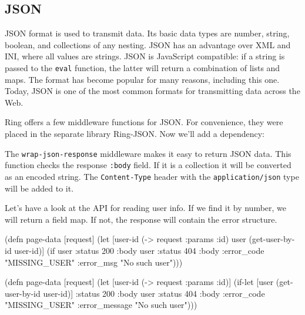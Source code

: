 \subsection{JSON}


JSON format is used to transmit data. Its basic data types are number, string, boolean, and collections of any nesting. JSON has an advantage over XML and INI, where all values are strings. JSON is JavaScript compatible: if a string is passed to the \verb|eval| function, the latter will return a combination of lists and maps. The format has become popular for many reasons, including this one. Today, JSON is one of the most common formats for transmitting data across the Web.

Ring offers a few middleware functions for JSON. For convenience, they were placed in the separate library Ring-JSON. Now we'll add a dependency:

\begin{clojure}
\end{clojure}


The \verb|wrap-json-response| middleware makes it easy to return JSON data. This function checks the response \verb|:body| field. If it is a collection it will be converted as an encoded string. The \verb|Content-Type| header with the \verb|application/json| type will be added to it.

Let's have a look at the API for reading user info. If we find it by number, we will return a field map. If not, the response will contain the error structure.

\ifx\DEVICETYPE\MOBILE

\begin{clojure}
(defn page-data [request]
  (let [user-id (-> request :params :id)
        user (get-user-by-id user-id)]
    (if user
      {:status 200 :body user}
      {:status 404
       :body
       {:error_code "MISSING_USER"
        :error_msg "No such user"}})))
\end{clojure}

\else

\begin{clojure}
(defn page-data [request]
  (let [user-id (-> request :params :id)]
    (if-let [user (get-user-by-id user-id)]
      {:status 200 :body user}
      {:status 404
       :body {:error_code "MISSING_USER"
              :error_message "No such user"}})))
\end{clojure}

